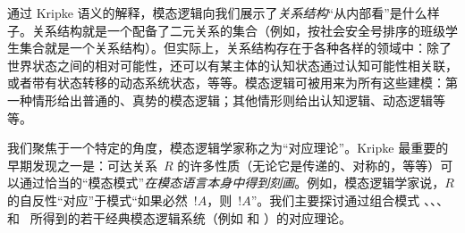 \documentclass[../../../include/open-logic-section]{subfiles}
\begin{document}
通过 Kripke 语义的解释，模态逻辑向我们展示了\emph{关系结构}“从内部看”是什么样子。关系结构就是一个配备了二元关系的集合（例如，按社会安全号排序的班级学生集合就是一个关系结构）。但实际上，关系结构存在于各种各样的领域中：除了世界状态之间的相对可能性，还可以有某主体的认知状态通过认知可能性相关联，或者带有状态转移的动态系统状态，等等。模态逻辑可被用来为所有这些建模：第一种情形给出普通的、真势的模态逻辑；其他情形则给出认知逻辑、动态逻辑等等。

我们聚焦于一个特定的角度，模态逻辑学家称之为“对应理论”。Kripke 最重要的早期发现之一是：可达关系~$R$ 的许多性质（无论它是传递的、对称的，等等）可以通过恰当的“模态模式”\emph{在模态语言本身中得到刻画}。例如，模态逻辑学家说，$R$ 的自反性“对应”于模式“如果必然~$!A$，则~$!A$”。我们主要探讨通过组合模式 、、、 和~ 所得到的若干经典模态逻辑系统（例如  和 ）的对应理论。
\end{document}
